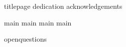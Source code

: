 


{titlepage}
{dedication}
{acknowledgements}

\tableofcontents

{main}
{main}
{main}
{main}

{openquestions}
\printbibliography

